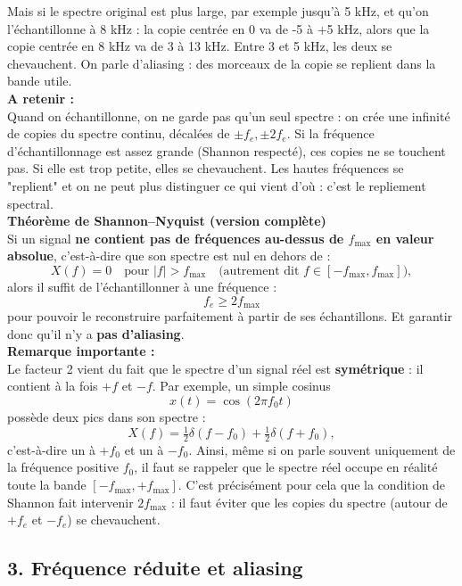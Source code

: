 Mais si le spectre original est plus large, par exemple jusqu’à 5 kHz, et qu'on l'échantillonne à 8 kHz : la copie centrée en 0 va de -5 à +5 kHz, alors que la copie centrée en 8 kHz va de 3 à 13 kHz. Entre 3 et 5 kHz, les deux se chevauchent. On parle d'aliasing : des morceaux de la copie se replient dans la bande utile. \\

\textbf{A retenir :} \\
Quand on échantillonne, on ne garde pas qu’un seul spectre : on crée une infinité de copies du spectre continu, décalées de $\pm f_e, \pm 2 f_e$. Si la fréquence d’échantillonnage est assez grande (Shannon respecté), ces copies ne se touchent pas. Si elle est trop petite, elles se chevauchent. Les hautes fréquences se "replient" et on ne peut plus distinguer ce qui vient d’où : c’est le repliement spectral. \\

\textbf{Théorème de Shannon–Nyquist (version complète)} \\[0.5em]
Si un signal \textbf{ne contient pas de fréquences au-dessus de $f_{\max}$ en valeur absolue}, c’est-à-dire que son spectre est nul en dehors de :
\[
X(f) = 0 \quad \text{pour } |f| > f_{\max} \quad \text{(autrement dit } f \in [-f_{\max}, f_{\max}] \text{)},
\]
alors il suffit de l’échantillonner à une fréquence :
\[
f_e \ge 2 f_{\max}
\]
pour pouvoir le reconstruire parfaitement à partir de ses échantillons. Et garantir donc qu'il n'y a \textbf{pas d’aliasing}. \\

\textbf{Remarque importante :} \\
Le facteur 2 vient du fait que le spectre d’un signal réel est \textbf{symétrique} : il contient à la fois $+f$ et $-f$.  
Par exemple, un simple cosinus
\[
x(t) = \cos(2\pi f_0 t)
\]
possède deux pics dans son spectre :
\[
X(f) = \tfrac{1}{2}\delta(f - f_0) + \tfrac{1}{2}\delta(f + f_0),
\]
c’est-à-dire un à $+f_0$ et un à $-f_0$.  
Ainsi, même si on parle souvent uniquement de la fréquence positive $f_0$, il faut se rappeler que le spectre réel occupe en réalité toute la bande $[-f_{\max}, +f_{\max}]$.  
C’est précisément pour cela que la condition de Shannon fait intervenir $2 f_{\max}$ : il faut éviter que les copies du spectre (autour de $+f_e$ et $-f_e$) se chevauchent. \\

\subsection*{3. Fréquence réduite et aliasing}

